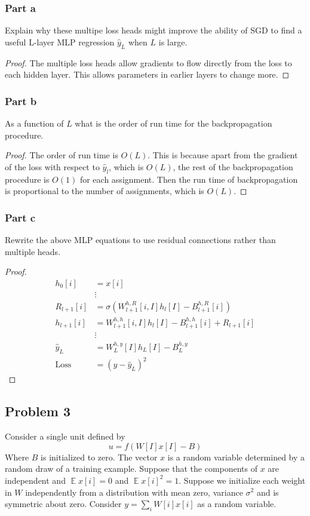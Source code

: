 \documentclass{amsart}
\DeclareMathOperator{\ee}{\mathbb{E}}
\theoremstyle{definition}
\begin{document}
\subsubsection*{Part a} Explain why these multipe loss heads might improve the ability of SGD to find a useful L-layer MLP regression $\hat{y}_L$ when $L$ is large. 
\begin{proof}
  The multiple loss heads allow gradients to flow directly from the loss to each hidden layer. 
  This allows parameters in earlier layers to change more. 
\end{proof}
\subsubsection*{Part b} As a function of $L$ what is the order of run time for the backpropagation procedure. 
\begin{proof}
  The order of run time is $O(L)$. This is because apart from the gradient of the loss with respect to $\hat{y}_l$, which is $O(L)$, 
  the rest of the backpropagation procedure is $O(1)$ for each assignment. 
  Then the run time of backpropagation is proportional to the number of assignments, which is $O(L)$.
\end{proof}

\subsubsection*{Part c} Rewrite the above MLP equations to use residual connections rather than multiple heads.
\begin{proof}
  \begin{align*}
    h_0[i] &= x[i]\\
    &\vdots \\
    R_{l + 1}[i] &= \sigma(W_{l + 1}^{h, R}[i, I] h_{l}[I] - B_{l + 1}^{h,R}[i]) \\
    h_{l + 1}[i] &= W_{l + 1}^{h, h}[i, I] h_{l}[I] - B_{l + 1}^{h,h}[i] + R_{l + 1}[i]\\
    & \vdots \\
    \hat{y}_L &= W_{L}^{h, y} [I] h_{L}[I] - B_{L}^{h, y}\\
    \mathrm{Loss} &= (y - \hat{y}_L)^2
  \end{align*}
\end{proof}

\subsection*{Problem 3}
Consider a single unit defined by 
\[
u = f(W[I]x[I] - B) 
\]
Where $B$ is initialized to zero. 
The vector $x$ is a random variable determined by a random draw of a training example. 
Suppose that the components of $x$ are independent and $\ee{x[i]} = 0$ and $\ee{x[i]^2} = 1$.
Suppose we initialize each weight in $W$ independently from a distribution with mean zero, variance $\sigma^2$  and is symmetric about zero.
Consider $y = \sum_i W[i]x[i]$ as a random variable. 
\end{document}
